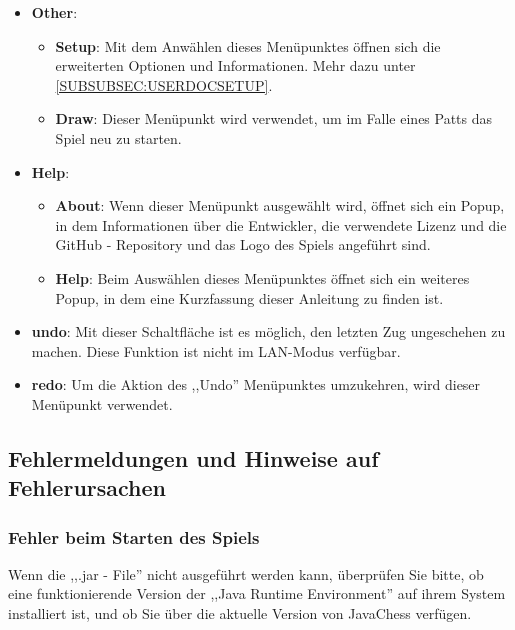 \documentclass[12pt,a4paper]{article}
\begin{document}
\begin{itemize}
	\item{\textbf{Other}: \begin{itemize}
	
			\item{\textbf{Setup}: Mit dem Anwählen dieses Menüpunktes öffnen sich die erweiterten Optionen und Informationen. Mehr dazu unter \ref{SUBSUBSEC:USERDOCSETUP}. }
			
			\item{\textbf{Draw}: Dieser Menüpunkt wird verwendet, um im Falle eines Patts das Spiel neu zu starten.}
			
	\end{itemize}}
	
	\item{\textbf{Help}: \begin{itemize}

		\item{\textbf{About}: Wenn dieser Menüpunkt ausgewählt wird, öffnet sich ein Popup, in dem Informationen über die Entwickler, die verwendete Lizenz und die GitHub - Repository und das Logo des Spiels angeführt sind. }	
		
		\item{\textbf{Help}: Beim Auswählen dieses Menüpunktes öffnet sich ein weiteres Popup, in dem eine Kurzfassung dieser Anleitung zu finden ist. }	
	
	\end{itemize}}
	
	\item{\textbf{undo}: Mit dieser Schaltfläche ist es möglich, den letzten Zug ungeschehen zu machen. Diese Funktion ist nicht im LAN-Modus verfügbar.}
	
	\item{\textbf{redo}: Um die Aktion des ,,Undo'' Menüpunktes umzukehren, wird dieser Menüpunkt verwendet. }
		
\end{itemize}
 
 \subsection{Fehlermeldungen und Hinweise auf Fehlerursachen}
 
 \subsubsection{Fehler beim Starten des Spiels}
 
  Wenn die ,,.jar - File'' nicht ausgeführt werden kann, überprüfen Sie bitte, ob eine funktionierende Version der ,,Java Runtime Environment'' auf ihrem System installiert ist, und ob Sie über die aktuelle Version von JavaChess verfügen. 
 
\end{document}
